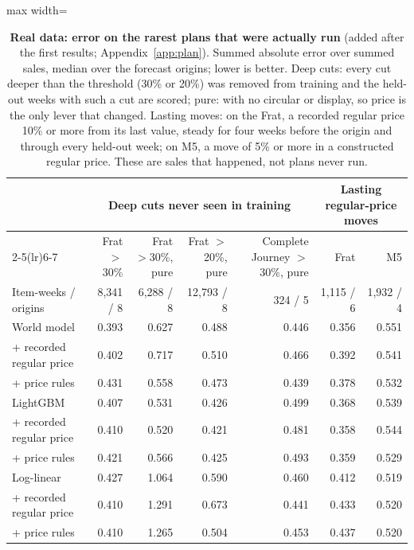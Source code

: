 \begin{table}[t]
\centering
\caption{\textbf{Real data: error on the rarest plans that were actually run} (added after the first results;
Appendix~\ref{app:plan}). Summed absolute error over summed sales, median over the forecast origins; lower is
better. Deep cuts: every cut deeper than the threshold (30\% or 20\%) was removed from training and the held-out
weeks with such a cut are scored; pure: with no circular or display, so price is the only lever that changed.
Lasting moves: on the Frat, a recorded regular price 10\% or more from its last value, steady for four weeks before
the origin and through every held-out week; on M5, a move of 5\% or more in a constructed regular price. These are
sales that happened, not plans never run.}
\label{tab:real}
\footnotesize\setlength{\tabcolsep}{4pt}
\begin{adjustbox}{max width=\textwidth}
\begin{tabular}{lrrrrrr}
\toprule
 & \multicolumn{4}{c}{Deep cuts never seen in training} & \multicolumn{2}{c}{Lasting regular-price moves} \\
\cmidrule(lr){2-5}\cmidrule(lr){6-7}
 & Frat $>$30\% & Frat $>$30\%, pure & Frat $>$20\%, pure & Complete Journey $>$30\%, pure & Frat & M5 \\
Item-weeks / origins & 8,341 / 8 & 6,288 / 8 & 12,793 / 8 & 324 / 5 & 1,115 / 6 & 1,932 / 4 \\
\midrule
World model & 0.393 & 0.627 & 0.488 & 0.446 & 0.356 & 0.551 \\
\quad + recorded regular price & 0.402 & 0.717 & 0.510 & 0.466 & 0.392 & 0.541 \\
\quad + price rules & 0.431 & 0.558 & 0.473 & 0.439 & 0.378 & 0.532 \\
LightGBM & 0.407 & 0.531 & 0.426 & 0.499 & 0.368 & 0.539 \\
\quad + recorded regular price & 0.410 & 0.520 & 0.421 & 0.481 & 0.358 & 0.544 \\
\quad + price rules & 0.421 & 0.566 & 0.425 & 0.493 & 0.359 & 0.529 \\
Log-linear & 0.427 & 1.064 & 0.590 & 0.460 & 0.412 & 0.519 \\
\quad + recorded regular price & 0.410 & 1.291 & 0.673 & 0.441 & 0.433 & 0.520 \\
\quad + price rules & 0.410 & 1.265 & 0.504 & 0.453 & 0.437 & 0.520 \\
\bottomrule
\end{tabular}
\end{adjustbox}
\end{table}
